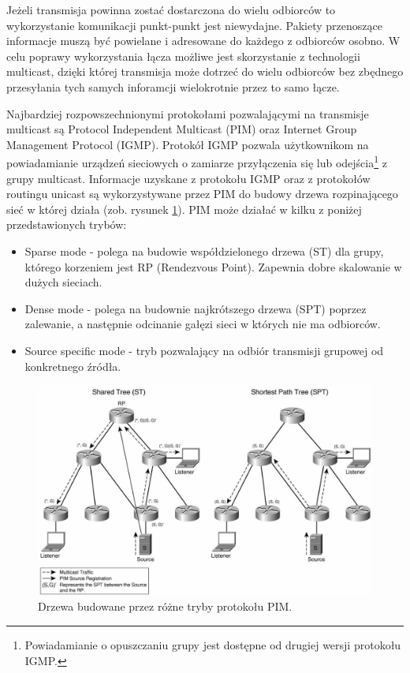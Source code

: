 Jeżeli transmisja powinna zostać dostarczona do wielu odbiorców to wykorzystanie komunikacji punkt-punkt jest niewydajne. Pakiety przenoszące informacje muszą być powielane i adresowane do każdego z odbiorców osobno. W celu poprawy wykorzystania łącza możliwe jest skorzystanie z technologii multicast, dzięki której transmisja może dotrzeć do wielu odbiorców bez zbędnego przesyłania tych samych inforamcji wielokrotnie przez to samo łącze. 

Najbardziej rozpowszechnionymi protokołami pozwalającymi na transmisje multicast są Protocol Independent Multicast (PIM) oraz Internet Group Management Protocol (IGMP). Protokół IGMP pozwala użytkownikom na powiadamianie urządzeń sieciowych o zamiarze przyłączenia się lub odejścia\footnote{Powiadamianie o opuszczaniu grupy jest dostępne od drugiej wersji protokołu IGMP.} z grupy multicast. Informacje uzyskane z protokołu IGMP oraz z protokołów routingu unicast są wykorzystywane przez PIM do budowy drzewa rozpinającego sieć w której działa (zob. rysunek \ref{fig:pim}). PIM może działać w kilku z poniżej przedstawionych trybów:
\begin{itemize}
\item Sparse mode - polega na budowie współdzielonego drzewa (ST) dla grupy, którego korzeniem jest RP (Rendezvous Point). Zapewnia dobre skalowanie w dużych sieciach.
\item Dense mode - polega na budownie najkrótszego drzewa (SPT) poprzez zalewanie, a następnie odcinanie gałęzi sieci w których nie ma odbiorców.
\item Source specific mode - tryb pozwalający na odbiór transmisji grupowej od konkretnego źródła.
\end{itemize}

\begin{figure}[h!]
	\centering
		\includegraphics[width=\linewidth]{pim}
	\caption{Drzewa budowane przez różne tryby protokołu PIM.}
	\label{fig:pim}
\end{figure}


